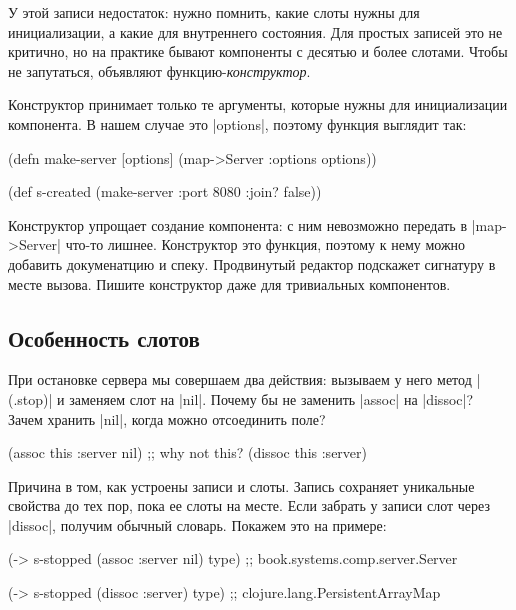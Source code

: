 У этой записи недостаток: нужно помнить, какие слоты нужны для инициализации, а
какие для внутреннего состояния. Для простых записей это не критично, но на
практике бывают компоненты с десятью и более слотами. Чтобы не запутаться,
объявляют функцию-\emph{конструктор}.

Конструктор принимает только те аргументы, которые нужны для инициализации
компонента. В нашем случае это \spverb|options|, поэтому функция выглядит так:

\begin{english}
  \begin{clojure}
(defn make-server
  [options]
  (map->Server {:options options}))

(def s-created (make-server {:port 8080 :join? false}))
  \end{clojure}
\end{english}

Конструктор упрощает создание компонента: с ним невозможно передать в
\spverb|map->Server| что-то лишнее. Конструктор это функция, поэтому к нему
можно добавить докуменатцию и спеку. Продвинутый редактор подскажет сигнатуру в
месте вызова. Пишите конструктор даже для тривиальных компонентов.

\subsection{Особенность слотов}

При остановке сервера мы совершаем два действия: вызываем у него метод
\spverb|(.stop)| и заменяем слот на \spverb|nil|. Почему бы не заменить
\spverb|assoc| на \spverb|dissoc|? Зачем хранить \spverb|nil|, когда можно
отсоединить поле?

\begin{english}
  \begin{clojure}
(assoc this :server nil)
;; why not this?
(dissoc this :server)
  \end{clojure}
\end{english}

Причина в том, как устроены записи и слоты. Запись сохраняет уникальные свойства
до тех пор, пока ее слоты на месте. Если забрать у записи слот через
\spverb|dissoc|, получим обычный словарь. Покажем это на примере:

\begin{english}
  \begin{clojure}
(-> s-stopped (assoc :server nil) type)
;; book.systems.comp.server.Server

(-> s-stopped (dissoc :server) type)
;; clojure.lang.PersistentArrayMap
  \end{clojure}
\end{english}

